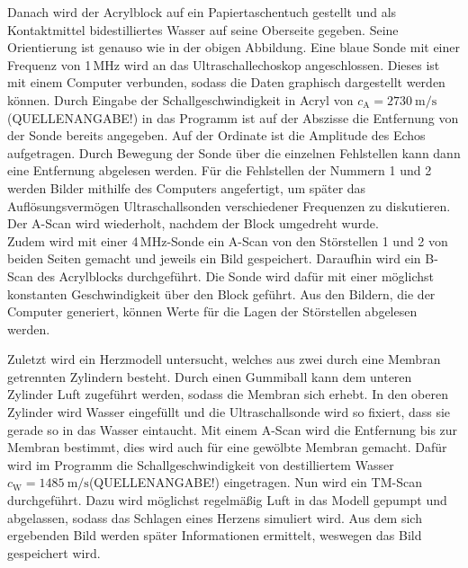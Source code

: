 Danach wird der Acrylblock auf ein Papiertaschentuch gestellt und als Kontaktmittel
bidestilliertes Wasser auf seine Oberseite gegeben. Seine Orientierung ist genauso wie in
der obigen Abbildung. Eine blaue Sonde mit einer Frequenz von 1\,MHz wird an das
Ultraschallechoskop angeschlossen. Dieses ist mit einem Computer verbunden, sodass
die Daten graphisch dargestellt werden können. Durch Eingabe der Schallgeschwindigkeit
in Acryl von $c_\text{A} = \SI{2730}{\meter\per\second}$(QUELLENANGABE!) in das Programm ist auf der Abszisse die
Entfernung von der Sonde bereits angegeben. Auf der Ordinate ist die Amplitude des Echos
aufgetragen. Durch Bewegung der Sonde über die einzelnen Fehlstellen kann dann eine
Entfernung abgelesen werden. Für die Fehlstellen der Nummern 1 und 2 werden Bilder mithilfe
des Computers angefertigt, um später das Auflösungsvermögen Ultraschallsonden verschiedener
Frequenzen zu diskutieren. Der A-Scan wird wiederholt, nachdem der Block umgedreht wurde.\\
Zudem wird mit einer 4\,MHz-Sonde ein A-Scan von den Störstellen 1 und 2 von beiden Seiten
gemacht und jeweils ein Bild gespeichert.
Daraufhin wird ein B-Scan des Acrylblocks durchgeführt. Die Sonde wird dafür mit einer
möglichst konstanten Geschwindigkeit über den Block geführt. Aus den Bildern, die
der Computer generiert, können Werte für die Lagen der Störstellen abgelesen werden.

Zuletzt wird ein Herzmodell untersucht, welches aus zwei durch eine Membran getrennten Zylindern
besteht. Durch einen Gummiball kann dem unteren Zylinder Luft zugeführt werden, sodass die Membran
sich erhebt. In den oberen Zylinder wird Wasser eingefüllt und die Ultraschallsonde
wird so fixiert, dass sie gerade so in das Wasser eintaucht. Mit einem A-Scan wird die
Entfernung bis zur Membran bestimmt, dies wird auch für eine gewölbte Membran gemacht.
Dafür wird im Programm die Schallgeschwindigkeit von destilliertem Wasser
$c_\text{W}=\SI{1485}{\meter\per\second}$(QUELLENANGABE!) eingetragen.
Nun wird ein TM-Scan durchgeführt. Dazu wird möglichst regelmäßig Luft in das Modell
gepumpt und abgelassen, sodass das Schlagen eines Herzens simuliert wird. Aus dem
sich ergebenden Bild werden später Informationen ermittelt, weswegen das Bild gespeichert wird.
